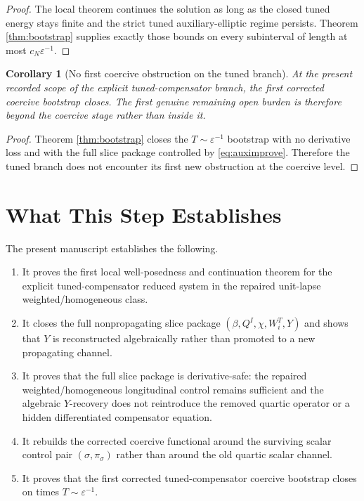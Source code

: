 \documentclass[11pt]{article}
\newtheorem{corollary}{Corollary}
\begin{document}
\begin{proof}
The local theorem continues the solution as long as the closed tuned energy stays finite and the strict tuned auxiliary-elliptic regime persists. Theorem \ref{thm:bootstrap} supplies exactly those bounds on every subinterval of length at most \(c_N\varepsilon^{-1}\).
\end{proof}

\begin{corollary}[No first coercive obstruction on the tuned branch]
\label{cor:noobstruction}
At the present recorded scope of the explicit tuned-compensator branch, the first corrected coercive bootstrap closes. The first genuine remaining open burden is therefore beyond the coercive stage rather than inside it.
\end{corollary}

\begin{proof}
Theorem \ref{thm:bootstrap} closes the \(T\sim\varepsilon^{-1}\) bootstrap with no derivative loss and with the full slice package controlled by \eqref{eq:auximprove}. Therefore the tuned branch does not encounter its first new obstruction at the coercive level.
\end{proof}

\section{What This Step Establishes}

The present manuscript establishes the following.
\begin{enumerate}
    \item It proves the first local well-posedness and continuation theorem for the explicit tuned-compensator reduced system in the repaired unit-lapse weighted/homogeneous class.
    \item It closes the full nonpropagating slice package \((\beta,Q^I,\chi,W_i^T,Y)\) and shows that \(Y\) is reconstructed algebraically rather than promoted to a new propagating channel.
    \item It proves that the full slice package is derivative-safe: the repaired weighted/homogeneous longitudinal control remains sufficient and the algebraic \(Y\)-recovery does not reintroduce the removed quartic operator or a hidden differentiated compensator equation.
    \item It rebuilds the corrected coercive functional around the surviving scalar control pair \((\sigma,\pi_\sigma)\) rather than around the old quartic scalar channel.
    \item It proves that the first corrected tuned-compensator coercive bootstrap closes on times \(T\sim\varepsilon^{-1}\).
\end{enumerate}
\end{document}
